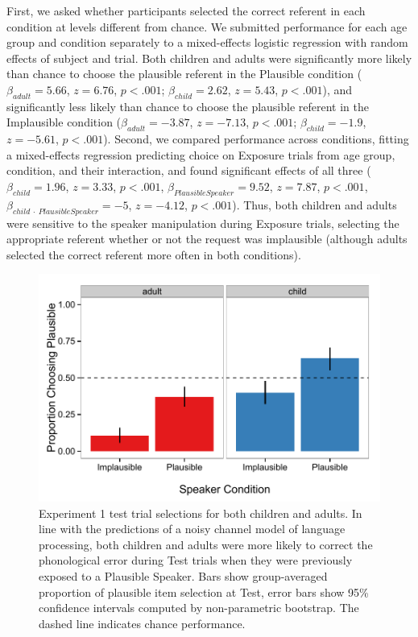 \documentclass[man,floatsintext]{apa6}
\begin{document}
First, we asked whether participants selected the correct referent in each condition at levels different from chance. We submitted performance for each age group and condition separately to a mixed-effects logistic regression with random effects of subject and trial. Both children and adults were significantly more likely than chance to choose the plausible referent in the Plausible condition ($\beta_{adult} = 5.66$, $z = 6.76$, $p <.001$; $\beta_{child} = 2.62$, $z = 5.43$, $p <.001$), and significantly less likely than chance to choose the plausible referent in the Implausible condition ($\beta_{adult} = -3.87$, $z = -7.13$, $p <.001$; $\beta_{child} = -1.9$, $z = -5.61$, $p <.001$). Second, we compared performance across conditions, fitting a mixed-effects regression predicting choice on Exposure trials from age group, condition, and their interaction, and found significant effects of all three ($\beta_{child} = 1.96$,  $z = 3.33$, $p <.001$, $\beta_{Plausible Speaker} = 9.52$,  $z = 7.87$, $p <.001$,  $\beta_{child\: \cdot \: Plausible Speaker} = -5$,  $z = -4.12$, $p <.001$). Thus, both children and adults were sensitive to the speaker manipulation during Exposure trials, selecting the appropriate referent whether or not the request was implausible (although adults selected the correct referent more often in both conditions).

\begin{figure}[t]
\centering
     \includegraphics[width=5in]{figures/exp1_results.pdf}
    \caption{Experiment 1 test trial selections for both children and adults. In line with the predictions of a noisy channel model of language processing, both children and adults were more likely to correct the phonological error during Test trials when they were previously exposed to a Plausible Speaker. Bars show group-averaged proportion of plausible item selection at Test, error bars show 95\% confidence intervals computed by non-parametric bootstrap. The dashed line indicates chance performance.}%
   \label{fig:exp1_results}
\end{figure}
\end{document}
